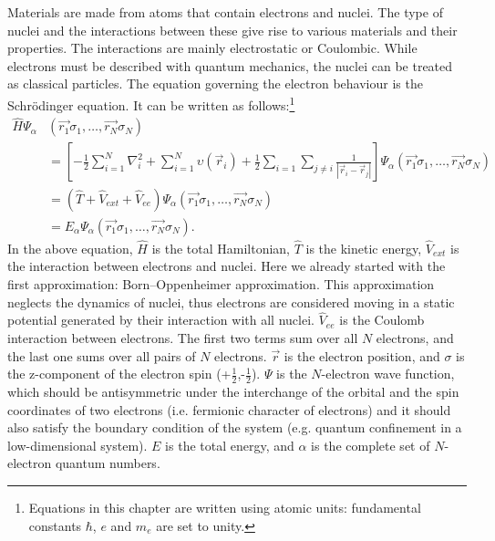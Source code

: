 Materials are made from atoms that contain electrons and nuclei. The type of nuclei and the interactions between these give rise to various materials and their properties. The interactions are mainly electrostatic or Coulombic. While electrons must be described with quantum mechanics, the nuclei can be treated as classical particles. The equation governing the electron behaviour is the Schr\"{o}dinger equation. It can be written as follows:\footnote{Equations in this chapter are written using atomic units: fundamental constants $\hbar$, $e$ and $m_e$ are set to unity.}
\begin{equation}\begin{aligned}
\hat{H}\mathit{\Psi}_\alpha &(\vec{r_1}\sigma_1,\ldots,\vec{r_N}\sigma_N) \\
&=\left[ -\frac{1}{2}\sum^N_{i=1}\nabla_i^2+\sum^N_{i=1}\upsilon(\vec{r}_i)+\frac{1}{2}\sum_{i=1}\sum_{j\neq i}\frac{1}{|\vec{r}_i-\vec{r}_j|}\right]\mathit{\Psi}_\alpha(\vec{r_1}\sigma_1,\ldots,\vec{r_N}\sigma_N)  \\
&=\left( \hat{T} + \hat{V}_{ext} + \hat{V}_{ee}\right)\mathit{\Psi}_\alpha(\vec{r_1}\sigma_1,\ldots,\vec{r_N}\sigma_N) \\
&=E_\alpha\mathit{\Psi}_\alpha(\vec{r_1}\sigma_1,\ldots,\vec{r_N}\sigma_N) .
\end{aligned}\end{equation}
In the above equation, $\hat{H}$ is the total Hamiltonian, $\hat{T}$ is the kinetic energy, $\hat{V}_{ext}$ is the interaction between electrons and nuclei. Here we already started with the first approximation: Born–Oppenheimer approximation\cite{Born1927}. This approximation neglects the dynamics of nuclei, thus electrons are considered moving in a static potential generated by their interaction with all nuclei. $\hat{V}_{ee}$ is the Coulomb interaction between electrons. The first two terms sum over all $N$ electrons, and the last one sums over all pairs of $N$ electrons. $\vec{r}$ is the electron position, and $\sigma$ is the z-component of the electron spin (+$\frac{1}{2}$,-$\frac{1}{2}$). $\mathit{\Psi}$ is the $N$-electron wave function, which should be antisymmetric under the interchange of the orbital and the spin coordinates of two electrons (i.e. fermionic character of electrons) and it should also satisfy the boundary condition of the system (e.g. quantum confinement in a low-dimensional system). $E$ is the total energy, and $\alpha$ is the complete set of $N$-electron quantum numbers. 

